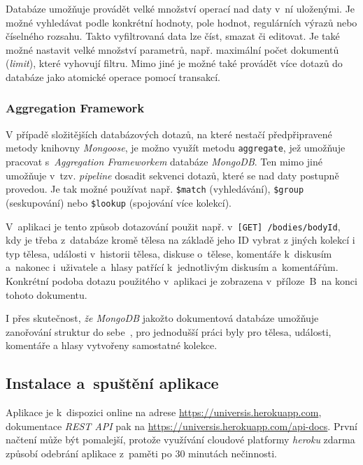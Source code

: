 \documentclass[a4paper,12pt]{article}
\def\code#1{\texttt{#1}}
\begin{document}
Databáze umožňuje provádět velké množství operací nad daty v~ní uloženými. Je možné vyhledávat podle konkrétní hodnoty, pole hodnot, regulárních výrazů nebo číselného rozsahu. Takto vyfiltrovaná data lze číst, smazat či editovat. Je také možné nastavit velké množství parametrů, např. maximální počet dokumentů (\textit{limit}), které vyhovují filtru. Mimo jiné je možné také provádět více dotazů do databáze jako atomické operace pomocí transakcí.~\cite{nodebook}



\vspace*{-0.5cm}
\subsubsection{Aggregation Framework}

V případě složitějších databázových dotazů, na které nestačí předpřipravené metody knihovny \textit{Mongoose}, je možno využít metodu \code{aggregate}, jež umožňuje pracovat s~\textit{Aggregation Frameworkem} databáze \textit{MongoDB}. Ten mimo jiné umožňuje v~tzv. \textit{pipeline} dosadit sekvenci dotazů, které se nad daty postupně provedou. Je tak možné používat např. \code{\$match} (vyhledávání), \code {\$group} (seskupování) nebo \code{\$lookup} (spojování více kolekcí).~\cite{aggregation}

V~aplikaci je tento způsob dotazování použit např. v~\code{[GET] /bodies/{bodyId}}, kdy je třeba z~databáze kromě tělesa na základě jeho ID vybrat z jiných kolekcí i typ tělesa, události v~historii tělesa, diskuse o~tělese, komentáře k~diskusím a~nakonec i~uživatele a~hlasy patřící k~jednotlivým diskusím a~komentářům. Konkrétní podoba dotazu použitého v~aplikaci je zobrazena v~příloze~B~na konci tohoto dokumentu.

I přes skutečnost, \textit{že MongoDB} jakožto dokumentová databáze umožňuje zanořování struktur do sebe~\cite{mongomongoose}, pro jednodušší práci byly pro tělesa, události, komentáře a hlasy vytvořeny samostatné kolekce.

\subsection{Instalace a~spuštění aplikace}

Aplikace je k~dispozici online na adrese \url{https://universis.herokuapp.com}, dokumentace \textit{REST API} pak na \url{https://universis.herokuapp.com/api-docs}. První načtení může být pomalejší, protože využívání cloudové platformy \textit{heroku} zdarma způsobí odebrání aplikace z~paměti po 30 minutách nečinnosti. 
\end{document}

